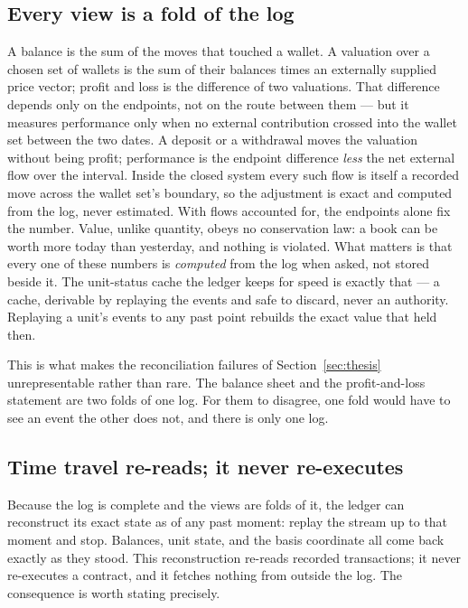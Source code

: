 \subsection{Every view is a fold of the log}

A balance is the sum of the moves that touched a wallet. A valuation over a chosen
set of wallets is the sum of their balances times an externally supplied price
vector; profit and loss is the difference of two valuations. That difference
depends only on the endpoints, not on the route between them --- but it measures
performance only when no external contribution crossed into the wallet set between
the two dates. A deposit or a withdrawal moves the valuation without being profit;
performance is the endpoint difference \emph{less} the net external flow over the
interval. Inside the closed system every such flow is itself a recorded move across
the wallet set's boundary, so the adjustment is exact and computed from the log,
never estimated. With flows accounted for, the endpoints alone fix the number.
Value, unlike quantity, obeys no conservation law: a book can be worth more today
than yesterday, and nothing is violated. What matters is that every one of these
numbers is \emph{computed} from the log when asked, not stored beside it. The
unit-status cache the ledger keeps for speed is exactly that --- a cache, derivable
by replaying the events and safe to discard, never an authority. Replaying a
unit's events to any past point rebuilds the exact value that held then.

This is what makes the reconciliation failures of
Section~\ref{sec:thesis} unrepresentable rather than rare. The balance sheet and
the profit-and-loss statement are two folds of one log. For them to disagree,
one fold would have to see an event the other does not, and there is only one log.

\subsection{Time travel re-reads; it never re-executes}

Because the log is complete and the views are folds of it, the ledger can
reconstruct its exact state as of any past moment: replay the stream up to that
moment and stop. Balances, unit state, and the basis coordinate all come back
exactly as they stood. This reconstruction re-reads recorded transactions; it
never re-executes a contract, and it fetches nothing from outside the log. The
consequence is worth stating precisely.

